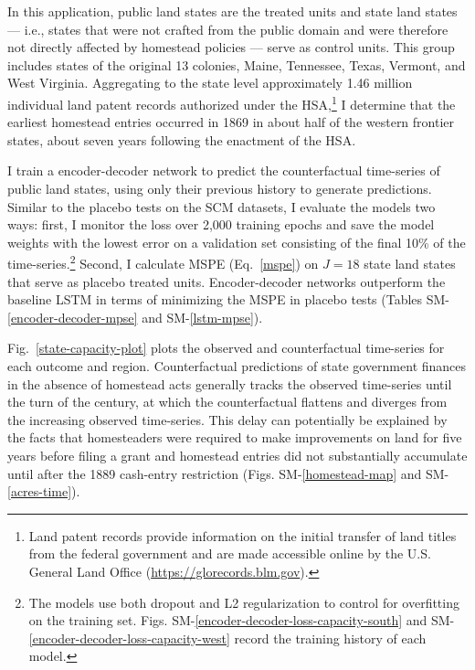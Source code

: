 \documentclass[hidelinks,12pt]{article}
\begin{document}
In this application, public land states are the treated units and state land states --- i.e., states that were not crafted from the public domain and were therefore not directly affected by homestead policies --- serve as control units. This group includes states of the original 13 colonies, Maine, Tennessee, Texas, Vermont, and West Virginia. Aggregating to the state level approximately 1.46 million individual land patent records authorized under the HSA,\footnote{Land patent records provide information on the initial transfer of land titles from the federal government and are made accessible online by the U.S. General Land Office (\url{https://glorecords.blm.gov}).} I determine that the earliest homestead entries occurred in 1869 in about half of the western frontier states, about seven years following the enactment of the HSA.

I train a encoder-decoder network to predict the counterfactual time-series of public land states, using only their previous history to generate predictions. Similar to the placebo tests on the SCM datasets, I evaluate the models two ways: first, I monitor the loss over 2,000 training epochs and save the model weights with the lowest error on a validation set consisting of the final 10\% of the time-series.\footnote{The models use both dropout and L2 regularization to control for overfitting on the training set. Figs. SM-\ref{encoder-decoder-loss-capacity-south} and SM-\ref{encoder-decoder-loss-capacity-west} record the training history of each model.} Second, I calculate MSPE (Eq.~\ref{mspe}) on $J=18$ state land states that serve as placebo treated units. Encoder-decoder networks outperform the baseline LSTM in terms of minimizing the MSPE in placebo tests (Tables SM-\ref{encoder-decoder-mpse} and SM-\ref{lstm-mpse}).

Fig.~\ref{state-capacity-plot} plots the observed and counterfactual time-series for each outcome and region. Counterfactual predictions of state government finances in the absence of homestead acts generally tracks the observed time-series until the turn of the century, at which the counterfactual flattens and diverges from the increasing observed time-series. This delay can potentially be explained by the facts that homesteaders were required to make improvements on land for five years before filing a grant and homestead entries did not substantially accumulate until after the 1889 cash-entry restriction (Figs. SM-\ref{homestead-map} and SM-\ref{acres-time}). 
\end{document}
